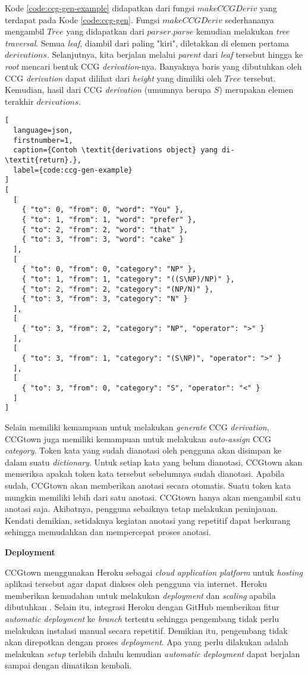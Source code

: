 Kode \ref{code:ccg-gen-example} didapatkan dari fungsi $makeCCGDeriv$ yang terdapat pada
Kode \ref{code:ccg-gen}. Fungsi $makeCCGDeriv$ sederhananya mengambil $Tree$ yang didapatkan
dari $parser.parse$ kemudian melakukan \textit{tree traversal}. Semua \textit{leaf}, diambil
dari paling "kiri", diletakkan di elemen pertama $derivations$. Selanjutnya, kita berjalan
melalui \textit{parent} dari \textit{leaf} tersebut hingga ke \textit{root} mencari bentuk CCG
\textit{derivation}-nya. Banyaknya baris yang dibutuhkan oleh CCG \textit{derivation} dapat
dilihat dari \textit{height} yang dimiliki oleh $Tree$ tersebut. Kemudian, hasil dari CCG
\textit{derivation} (umumnya berupa $S$) merupakan elemen terakhir $derivations$.

\begin{lstlisting}[
  language=json,
  firstnumber=1,
  caption={Contoh \textit{derivations object} yang di-\textit{return}.},
  label={code:ccg-gen-example}
]
[
  [
    { "to": 0, "from": 0, "word": "You" },
    { "to": 1, "from": 1, "word": "prefer" },
    { "to": 2, "from": 2, "word": "that" },
    { "to": 3, "from": 3, "word": "cake" }
  ],
  [
    { "to": 0, "from": 0, "category": "NP" },
    { "to": 1, "from": 1, "category": "((S\NP)/NP)" },
    { "to": 2, "from": 2, "category": "(NP/N)" },
    { "to": 3, "from": 3, "category": "N" }
  ],
  [
    { "to": 3, "from": 2, "category": "NP", "operator": ">" }
  ],
  [
    { "to": 3, "from": 1, "category": "(S\NP)", "operator": ">" }
  ],
  [
    { "to": 3, "from": 0, "category": "S", "operator": "<" }
  ]
]
\end{lstlisting}

Selain memiliki kemampuan untuk melakukan \textit{generate} CCG \textit{derivation},
CCGtown juga memiliki kemampuan untuk melakukan \textit{auto-assign} CCG \textit{category}.
Token kata yang sudah dianotasi oleh pengguna akan disimpan ke dalam suatu \textit{dictionary}.
Untuk setiap kata yang belum dianotasi, CCGtown akan memeriksa apakah token kata tersebut
sebelumnya sudah dianotasi. Apabila sudah, CCGtown akan memberikan anotasi secara otomatis.
Suatu token kata mungkin memiliki lebih dari satu anotasi. CCGtown hanya akan mengambil satu
anotasi saja. Akibatnya, pengguna sebaiknya tetap melakukan peninjauan.
Kendati demikian, setidaknya kegiatan anotasi yang repetitif dapat berkurang sehingga memudahkan
dan mempercepat proses anotasi.


\noindent\textbf{Deployment}

CCGtown menggunakan Heroku sebagai \textit{cloud application platform} untuk \textit{hosting}
aplikasi tersebut agar dapat diakses oleh pengguna via internet. Heroku memberikan kemudahan
untuk melakukan \textit{deployment} dan \textit{scaling} apabila dibutuhkan
\citep{middleton2013heroku}. Selain itu, integrasi Heroku dengan GitHub memberikan fitur
\textit{automatic deployment} ke \textit{branch} tertentu sehingga pengembang tidak perlu
melakukan instalasi manual secara repetitif. Demikian itu, pengembang tidak akan direpotkan
dengan proses \textit{deployment}. Apa yang perlu dilakukan adalah melakukan \textit{setup}
terlebih dahulu kemudian \textit{automatic deployment} dapat berjalan sampai dengan dimatikan
kembali.

